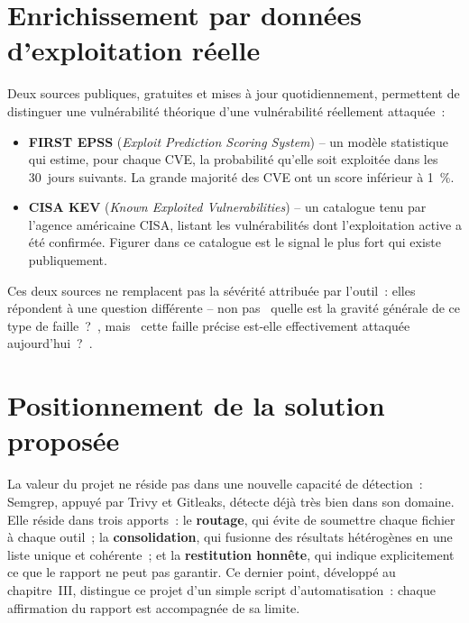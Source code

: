 \documentclass[12pt,a4paper,oneside]{report}
\begin{document}
\section{Enrichissement par donn\'ees d'exploitation r\'eelle}
Deux sources publiques, gratuites et mises \`a jour quotidiennement, permettent de distinguer une vuln\'erabilit\'e th\'eorique d'une vuln\'erabilit\'e r\'eellement attaqu\'ee~:
\begin{itemize}
\item \textbf{FIRST EPSS} (\emph{Exploit Prediction Scoring System}) -- un mod\`ele statistique qui estime, pour chaque CVE, la probabilit\'e qu'elle soit exploit\'ee dans les 30~jours suivants. La grande majorit\'e des CVE ont un score inf\'erieur \`a 1~\%.
\item \textbf{CISA KEV} (\emph{Known Exploited Vulnerabilities}) -- un catalogue tenu par l'agence am\'ericaine CISA, listant les vuln\'erabilit\'es dont l'exploitation active a \'et\'e confirm\'ee. Figurer dans ce catalogue est le signal le plus fort qui existe publiquement.
\end{itemize}
Ces deux sources ne remplacent pas la s\'ev\'erit\'e attribu\'ee par l'outil~: elles r\'epondent \`a une question diff\'erente -- non pas \guillemotleft~quelle est la gravit\'e g\'en\'erale de ce type de faille~?~\guillemotright, mais \guillemotleft~cette faille pr\'ecise est-elle effectivement attaqu\'ee aujourd'hui~?~\guillemotright.

\section{Positionnement de la solution propos\'ee}
La valeur du projet ne r\'eside pas dans une nouvelle capacit\'e de d\'etection~: Semgrep, appuy\'e par Trivy et Gitleaks, d\'etecte d\'ej\`a tr\`es bien dans son domaine. Elle r\'eside dans trois apports~: le \textbf{routage}, qui \'evite de soumettre chaque fichier \`a chaque outil~; la \textbf{consolidation}, qui fusionne des r\'esultats h\'et\'erog\`enes en une liste unique et coh\'erente~; et la \textbf{restitution honn\^ete}, qui indique explicitement ce que le rapport ne peut pas garantir. Ce dernier point, d\'evelopp\'e au chapitre~III, distingue ce projet d'un simple script d'automatisation~: chaque affirmation du rapport est accompagn\'ee de sa limite.
\end{document}

